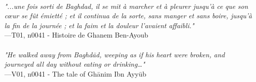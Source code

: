 \documentclass[../Carre_nights.tex]{subfiles}
\begin{document}
\textit{\\
"...une fois sorti de Baghdad, il se mit à marcher et à pleurer jusqu’à ce que son cœur se fût émietté ; et il continua de la sorte, sans manger et sans boire, jusqu’à la fin de la journée ; et la faim et la douleur l’avaient affaibli."} \\
—T01, n0041 - Histoire de Ghanem Ben-Ayoub \\~\\
\textit{"He walked away from Baghd\=ad, weeping as if his heart were broken, and journeyed all day without eating or drinking…"} \\
—V01, n0041 - The tale of Gh\=anim Ibn Ayy\=ub
\end{document}
